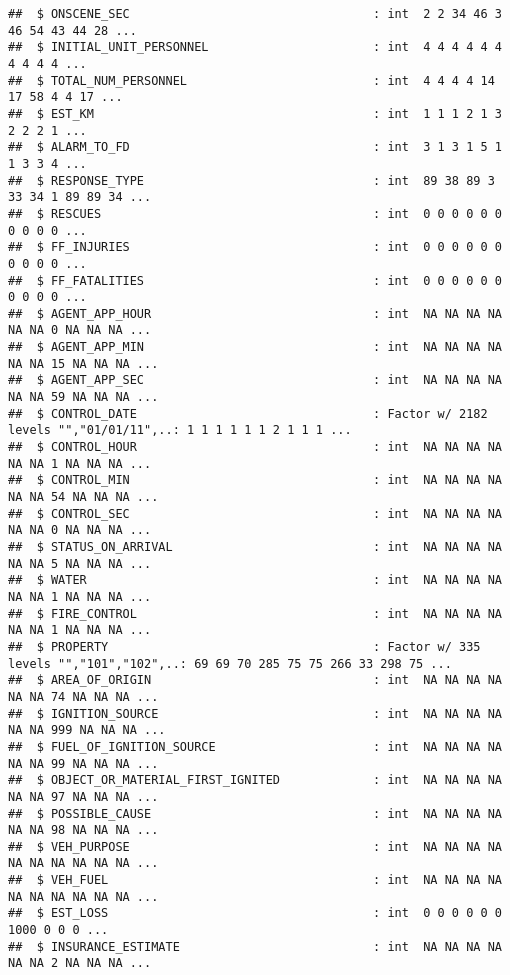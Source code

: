 \documentclass[]{article}
\begin{document}
\begin{verbatim}
##  $ ONSCENE_SEC                                  : int  2 2 34 46 3 46 54 43 44 28 ...
##  $ INITIAL_UNIT_PERSONNEL                       : int  4 4 4 4 4 4 4 4 4 4 ...
##  $ TOTAL_NUM_PERSONNEL                          : int  4 4 4 4 14 17 58 4 4 17 ...
##  $ EST_KM                                       : int  1 1 1 2 1 3 2 2 2 1 ...
##  $ ALARM_TO_FD                                  : int  3 1 3 1 5 1 1 3 3 4 ...
##  $ RESPONSE_TYPE                                : int  89 38 89 3 33 34 1 89 89 34 ...
##  $ RESCUES                                      : int  0 0 0 0 0 0 0 0 0 0 ...
##  $ FF_INJURIES                                  : int  0 0 0 0 0 0 0 0 0 0 ...
##  $ FF_FATALITIES                                : int  0 0 0 0 0 0 0 0 0 0 ...
##  $ AGENT_APP_HOUR                               : int  NA NA NA NA NA NA 0 NA NA NA ...
##  $ AGENT_APP_MIN                                : int  NA NA NA NA NA NA 15 NA NA NA ...
##  $ AGENT_APP_SEC                                : int  NA NA NA NA NA NA 59 NA NA NA ...
##  $ CONTROL_DATE                                 : Factor w/ 2182 levels "","01/01/11",..: 1 1 1 1 1 1 2 1 1 1 ...
##  $ CONTROL_HOUR                                 : int  NA NA NA NA NA NA 1 NA NA NA ...
##  $ CONTROL_MIN                                  : int  NA NA NA NA NA NA 54 NA NA NA ...
##  $ CONTROL_SEC                                  : int  NA NA NA NA NA NA 0 NA NA NA ...
##  $ STATUS_ON_ARRIVAL                            : int  NA NA NA NA NA NA 5 NA NA NA ...
##  $ WATER                                        : int  NA NA NA NA NA NA 1 NA NA NA ...
##  $ FIRE_CONTROL                                 : int  NA NA NA NA NA NA 1 NA NA NA ...
##  $ PROPERTY                                     : Factor w/ 335 levels "","101","102",..: 69 69 70 285 75 75 266 33 298 75 ...
##  $ AREA_OF_ORIGIN                               : int  NA NA NA NA NA NA 74 NA NA NA ...
##  $ IGNITION_SOURCE                              : int  NA NA NA NA NA NA 999 NA NA NA ...
##  $ FUEL_OF_IGNITION_SOURCE                      : int  NA NA NA NA NA NA 99 NA NA NA ...
##  $ OBJECT_OR_MATERIAL_FIRST_IGNITED             : int  NA NA NA NA NA NA 97 NA NA NA ...
##  $ POSSIBLE_CAUSE                               : int  NA NA NA NA NA NA 98 NA NA NA ...
##  $ VEH_PURPOSE                                  : int  NA NA NA NA NA NA NA NA NA NA ...
##  $ VEH_FUEL                                     : int  NA NA NA NA NA NA NA NA NA NA ...
##  $ EST_LOSS                                     : int  0 0 0 0 0 0 1000 0 0 0 ...
##  $ INSURANCE_ESTIMATE                           : int  NA NA NA NA NA NA 2 NA NA NA ...

\end{verbatim}
\end{document}
